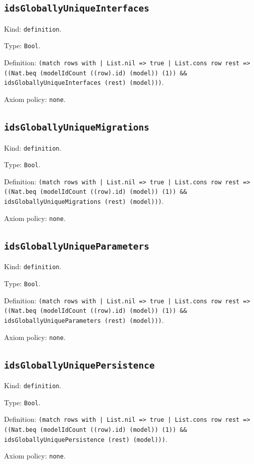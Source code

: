 \documentclass[11pt]{article}
\begin{document}
\subsection*{\texttt{idsGloballyUniqueInterfaces}}
\noindent Kind: \texttt{definition}.\par
\noindent Type: \texttt{Bool}.\par
\noindent Definition: \texttt{(match rows with | List.nil => true | List.cons row rest => ((Nat.beq (modelIdCount ((row).id) (model)) (1)) \&\& idsGloballyUniqueInterfaces (rest) (model)))}.\par
\noindent Axiom policy: \texttt{none}.\par
\subsection*{\texttt{idsGloballyUniqueMigrations}}
\noindent Kind: \texttt{definition}.\par
\noindent Type: \texttt{Bool}.\par
\noindent Definition: \texttt{(match rows with | List.nil => true | List.cons row rest => ((Nat.beq (modelIdCount ((row).id) (model)) (1)) \&\& idsGloballyUniqueMigrations (rest) (model)))}.\par
\noindent Axiom policy: \texttt{none}.\par
\subsection*{\texttt{idsGloballyUniqueParameters}}
\noindent Kind: \texttt{definition}.\par
\noindent Type: \texttt{Bool}.\par
\noindent Definition: \texttt{(match rows with | List.nil => true | List.cons row rest => ((Nat.beq (modelIdCount ((row).id) (model)) (1)) \&\& idsGloballyUniqueParameters (rest) (model)))}.\par
\noindent Axiom policy: \texttt{none}.\par
\subsection*{\texttt{idsGloballyUniquePersistence}}
\noindent Kind: \texttt{definition}.\par
\noindent Type: \texttt{Bool}.\par
\noindent Definition: \texttt{(match rows with | List.nil => true | List.cons row rest => ((Nat.beq (modelIdCount ((row).id) (model)) (1)) \&\& idsGloballyUniquePersistence (rest) (model)))}.\par
\noindent Axiom policy: \texttt{none}.\par
\end{document}
